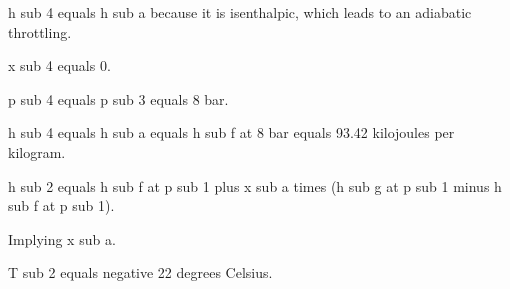 h sub 4 equals h sub a because it is isenthalpic, which leads to an adiabatic throttling.

x sub 4 equals 0.

p sub 4 equals p sub 3 equals 8 bar.

h sub 4 equals h sub a equals h sub f at 8 bar equals 93.42 kilojoules per kilogram.

h sub 2 equals h sub f at p sub 1 plus x sub a times (h sub g at p sub 1 minus h sub f at p sub 1).

Implying x sub a.

T sub 2 equals negative 22 degrees Celsius.